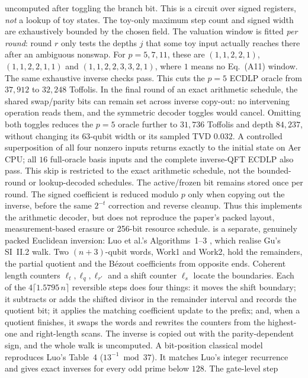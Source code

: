 uncomputed after toggling the branch bit. This is a circuit over signed
registers, \emph{not} a lookup of toy states. The toy-only maximum step count and
signed width are exhaustively bounded by the chosen field. The valuation
window is fitted \emph{per round}: round $r$ only tests the depths $j$ that
some toy input actually reaches there after an ambiguous nonswap. For
$p=5,7,11$, these are $(1,1,2,2,1)$, $(1,1,2,2,1,1)$ and
$(1,1,2,2,3,3,2,1)$, where $1$ means no Eq.~(A11) window. The same exhaustive
inverse checks pass. This cuts the $p=5$ ECDLP oracle from $37{,}912$ to
$32{,}248$ Toffolis. In the final round of an exact arithmetic schedule,
the shared swap/parity bits can remain set across inverse copy-out: no
intervening operation reads them, and the symmetric decoder toggles
would cancel. Omitting both toggles reduces the $p=5$ oracle further to
$31{,}736$ Toffolis and depth $84{,}237$, without changing its $63$-qubit
width or its sampled TVD $0.032$. A controlled superposition of all
four nonzero inputs returns exactly to the initial state on Aer CPU;
all $16$ full-oracle basis inputs and the complete inverse-QFT ECDLP
also pass. This skip is restricted to the exact arithmetic schedule,
not the bounded-round or lookup-decoded schedules. The active/frozen bit
remains stored once per round. The signed
coefficient is reduced modulo $p$ only when copying out the inverse, before
the same $2^{-t}$ correction and reverse cleanup. Thus this implements the
arithmetic decoder, but does not reproduce the paper's packed layout,
measurement-based erasure or 256-bit resource schedule.
 is a separate, genuinely packed Euclidean inversion:
Luo et al.'s Algorithms~1--3 \cite{ec:luo26}, which realise Gu's SI~II.2 walk.
Two $(n+3)$-qubit words, Work1 and Work2, hold the remainders, the partial
quotient and the B\'ezout coefficients from opposite ends. Coherent length
counters $\ell_t,\ell_q,\ell_{r'}$ and a shift counter $\ell_s$ locate
the boundaries. Each of the $4\lceil1.5795\,n\rceil$ reversible steps does
four things: it moves the shift boundary; it subtracts or adds the shifted
divisor in the remainder interval and records the quotient bit; it applies
the matching coefficient update to the prefix; and, when a quotient finishes,
it swaps the words and rewrites the counters from the highest-one and
right-length scans. The inverse is copied out with the parity-dependent sign,
and the whole walk is uncomputed. A bit-position classical model reproduces
Luo's Table~4 ($13^{-1}\bmod37$). It matches Luo's integer recurrence and
gives exact inverses for every odd prime below $128$. The gate-level step
